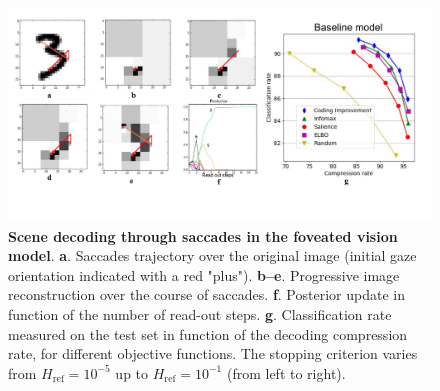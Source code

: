 \documentclass{article}
\begin{document}
\begin{figure}[t]
	\vspace{0cm}
	\centerline{
	\includegraphics[width=.8\linewidth]{img/NIPS-saccade.pdf}}
	\vspace{-1.2cm}
	\caption{\textbf{Scene decoding through saccades in the foveated vision model}. \textbf{a}. Saccades trajectory over the original image (initial gaze orientation indicated with a red "plus"). \textbf{b--e}. Progressive image reconstruction over the course of saccades.
	\textbf{f}. Posterior update in function of the number of read-out steps.
	\textbf{g}.  Classification rate measured on the test set in function of the decoding compression rate, for different objective functions. The stopping criterion varies from $H_\text{ref}=10^{-5}$ up to  $H_\text{ref}=10^{-1}$ (from left to right).}\label{fig:foveated-saccades}
	\vspace{-.5cm}
\end{figure}
\end{document}
